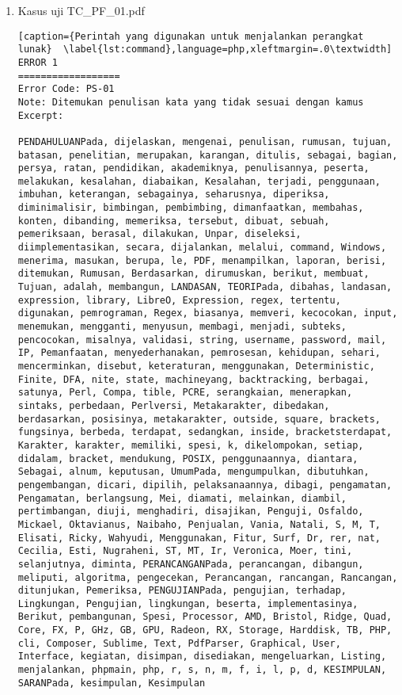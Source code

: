\begin{enumerate}

	\item Kasus uji TC\_PF\_01.pdf
	
\begin{lstlisting}[caption={Perintah yang digunakan untuk menjalankan perangkat lunak}	\label{lst:command},language=php,xleftmargin=.0\textwidth]
ERROR 1
==================
Error Code: PS-01
Note: Ditemukan penulisan kata yang tidak sesuai dengan kamus
Excerpt: 

PENDAHULUANPada, dijelaskan, mengenai, penulisan, rumusan, tujuan, batasan, penelitian, merupakan, karangan, ditulis, sebagai, bagian, persya, ratan, pendidikan, akademiknya, penulisannya, peserta, melakukan, kesalahan, diabaikan, Kesalahan, terjadi, penggunaan, imbuhan, keterangan, sebagainya, seharusnya, diperiksa, diminimalisir, bimbingan, pembimbing, dimanfaatkan, membahas, konten, dibanding, memeriksa, tersebut, dibuat, sebuah, pemeriksaan, berasal, dilakukan, Unpar, diseleksi, diimplementasikan, secara, dijalankan, melalui, command, Windows, menerima, masukan, berupa, le, PDF, menampilkan, laporan, berisi, ditemukan, Rumusan, Berdasarkan, dirumuskan, berikut, membuat, Tujuan, adalah, membangun, LANDASAN, TEORIPada, dibahas, landasan, expression, library, LibreO, Expression, regex, tertentu, digunakan, pemrograman, Regex, biasanya, memveri, kecocokan, input, menemukan, mengganti, menyusun, membagi, menjadi, subteks, pencocokan, misalnya, validasi, string, username, password, mail, IP, Pemanfaatan, menyederhanakan, pemrosesan, kehidupan, sehari, mencerminkan, disebut, keteraturan, menggunakan, Deterministic, Finite, DFA, nite, state, machineyang, backtracking, berbagai, satunya, Perl, Compa, tible, PCRE, serangkaian, menerapkan, sintaks, perbedaan, Perlversi, Metakarakter, dibedakan, berdasarkan, posisinya, metakarakter, outside, square, brackets, fungsinya, berbeda, terdapat, sedangkan, inside, bracketsterdapat, Karakter, karakter, memiliki, spesi, k, dikelompokan, setiap, didalam, bracket, mendukung, POSIX, penggunaannya, diantara, Sebagai, alnum, keputusan, UmumPada, mengumpulkan, dibutuhkan, pengembangan, dicari, dipilih, pelaksanaannya, dibagi, pengamatan, Pengamatan, berlangsung, Mei, diamati, melainkan, diambil, pertimbangan, diuji, menghadiri, disajikan, Penguji, Osfaldo, Mickael, Oktavianus, Naibaho, Penjualan, Vania, Natali, S, M, T, Elisati, Ricky, Wahyudi, Menggunakan, Fitur, Surf, Dr, rer, nat, Cecilia, Esti, Nugraheni, ST, MT, Ir, Veronica, Moer, tini, selanjutnya, diminta, PERANCANGANPada, perancangan, dibangun, meliputi, algoritma, pengecekan, Perancangan, rancangan, Rancangan, ditunjukan, Pemeriksa, PENGUJIANPada, pengujian, terhadap, Lingkungan, Pengujian, lingkungan, beserta, implementasinya, Berikut, pembangunan, Spesi, Processor, AMD, Bristol, Ridge, Quad, Core, FX, P, GHz, GB, GPU, Radeon, RX, Storage, Harddisk, TB, PHP, cli, Composer, Sublime, Text, PdfParser, Graphical, User, Interface, kegiatan, disimpan, disediakan, mengeluarkan, Listing, menjalankan, phpmain, php, r, s, n, m, f, i, l, p, d, KESIMPULAN, SARANPada, kesimpulan, Kesimpulan
\end{lstlisting}
	

\end{enumerate}

